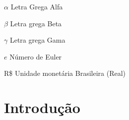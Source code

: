\documentclass[
  12pt,		%
  a4paper,	%
  openright,%
  oneside,	%
  chapter=TITLE,		%
  section=TITLE,		%
  english,	%
  french,	%
  spanish,	%
  brazil	%
]{abntex2}
\begin{document}
    
    \begin{simbolos}
        \item[$\alpha$] Letra Grega Alfa
        \item[$\beta$] Letra grega Beta
        \item[$\gamma$] Letra grega Gama
        \item[$e$] Número de Euler
        \item[R\$] Unidade monetária Brasileira (Real)
    \end{simbolos}
    
    
    \tableofcontents*
    \newpage
    
    
    \textual
    \pagestyle{simple} 
    
    
    \chapter{Introdução}
    
\end{document}
